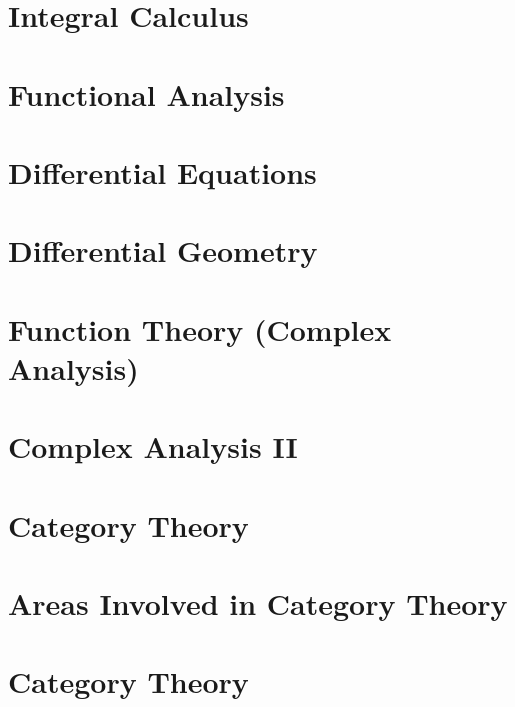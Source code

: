 \documentclass[a4paper]{article}
\begin{document}
\section{Integral Calculus}

\section{Functional Analysis}

\section{Differential Equations}

\section{Differential Geometry}

\section{Function Theory (Complex Analysis)}

\section{Complex Analysis II}

\section*{Category Theory}

\section{Areas Involved in Category Theory}

\section{Category Theory}
\end{document}
